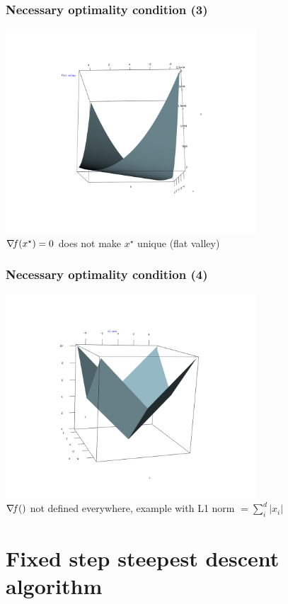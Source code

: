 \documentclass[12pt]{beamer}
\begin{document}
\begin{frame}
\frametitle{Necessary optimality condition (3)} 
\begin{center}
\includegraphics[width=0.7\textwidth]{flat_valley.png} \\
$\nabla\!{f}(x^\star) = 0$ does not make $x^\star$ unique (flat valley)
\end{center}
\end{frame}

\begin{frame}
\frametitle{Necessary optimality condition (4)} 
\begin{center}
\includegraphics[width=0.7\textwidth]{L1norm.png} \\
$\nabla\!{f}()$ not defined everywhere, example with L1 norm $= \sum_i^d \lvert x_i \rvert$
\end{center}
\end{frame}

\section{Fixed step steepest descent algorithm}
\end{document}
